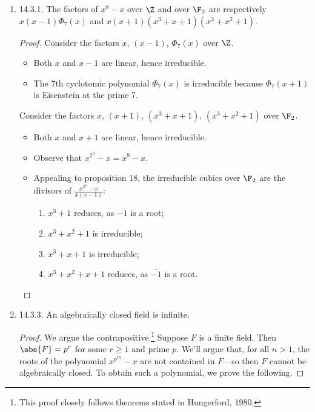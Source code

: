\documentclass[onesided]{ccg-pset}
\begin{document}
\begin{enumerate}
\item \label{14.3.1} 14.3.1.
The factors of $x^8 - x$ over $\Z$ and over $\F_2$ are respectively $x(x-1)\Phi_7(x)$ and $x(x+1)(x^3 + x + 1)(x^3 + x^2 + 1)$.

\begin{proof}
    Consider the factors $x$, $(x-1)$, $\Phi_7(x)$ over $\Z$. 
    \begin{itemize}
        \item Both $x$ and $x-1$ are linear, hence irreducible.
        \item The $7$th cyclotomic polynomial $\Phi_7(x)$ is irreducible because $\Phi_7(x+1)$ is Eisenstein at the prime $7$.
    \end{itemize}

    Consider the factors $x$, $(x+1)$, $(x^3 + x + 1)$, $(x^3 + x^2 + 1)$ over $\F_2$.
    \begin{itemize}
        \item Both $x$ and $x+1$ are linear, hence irreducible.
        \item Observe that $x^{2^{3}}-x = x^8 - x$.
        \item Appealing to proposition 18, the irreducible cubics over $\F_2$ are the divisors of $\frac{x^{2^{3}} -x}{x(x-1)}$:
        \begin{enumerate}
            \item \(x^3 + 1\) reduces, as \(\overline{ -1 }\) is a root;
            \item \(x^3 +x^2 + 1\) is irreducible;
            \item \(x^3 + x + 1\) is irreducible;
            \item \(x^3 + x^2 + x + 1\) reduces, as \(\overline{ -1 }\) is a root.
        \end{enumerate}
    \end{itemize}
\end{proof}


\item \label{14.3.3} 14.3.3.
An algebraically closed field is infinite.

\begin{proof}
    We argue the contrapositive.\footnote{This proof closely follows theorems stated in Hungerford, 1980.} Suppose $F$ is a finite field. Then $\abs{F} = p^r$ for some $r \ge 1$ and prime $p$. We'll argue that, for all $n > 1$, the roots of the polynomial $x^{p^{rn}} - x$ are not contained in $F$---so then $F$ cannot be algebraically closed. To obtain such a polynomial, we prove the following.


\end{proof}
\end{enumerate}
\end{document}

